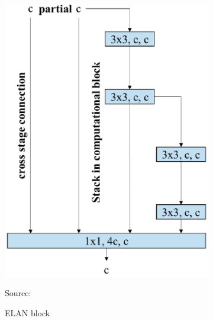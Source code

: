   \begin{figure}[p]
    \centering
    \begin{subfigure}[b]{.5\textwidth}
        \centering
        \includegraphics[width=.8\linewidth]{figures/elan-block.png}
        \caption*{Source: \textcite{yolov7}}
        \caption{ELAN block}
        \label{fig:elan-block}
    \end{subfigure}%
    \begin{subfigure}[b]{.5\textwidth}
        \centering

\end{subfigure}
\end{figure}
